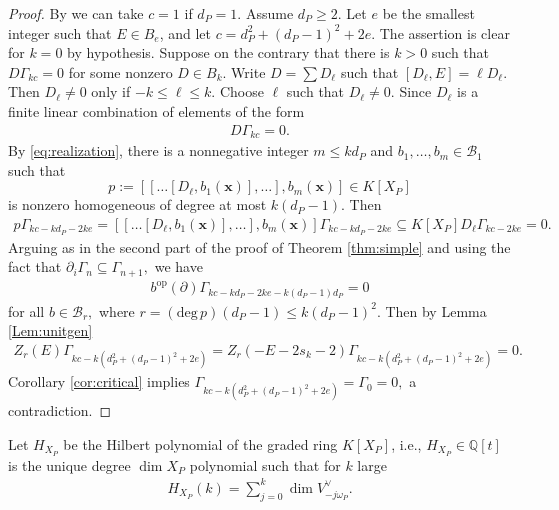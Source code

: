 \documentclass[11pt,a4paper,usenames,dvipsnames,reqno]{amsart}
\numberwithin{equation}{section}
\newcommand{\qq}{\mathbb Q}
\theoremstyle{definition}
\theoremstyle{remark}
\begin{document}
\begin{proof}
By \cite[Lemma 9.4.1]{C:Dmod} we can take $c=1$ if $d_P=1$. Assume $d_P\ge 2$. Let $e$ be the smallest integer such that $E\in B_{e}$, and let $c=d_P^2+(d_P-1)^2+2e.$ The assertion is clear for $k=0$ by hypothesis. Suppose on the contrary that there is $k>0$ such that $D\Gamma_{kc}=0$ for some nonzero $D\in B_k$. Write $D=\sum D_\ell$ such that $[D_\ell,E]=\ell D_\ell.$ Then $D_\ell\neq 0$ only if $-k\le \ell\le k$. Choose $\ell$ such that $D_\ell\neq 0$. Since $D_\ell$ is a finite linear combination of elements of the form
\begin{align*}
   [[\ldots[D,\underbrace{E],\ldots], E]}_{r \textrm{ times}}
\end{align*}
for $0\le r\le 2k,$ we have 
\begin{align*}
    D_\ell\Gamma_{kc-2ke}\subseteq K[E]D\Gamma_{kc}=0.
\end{align*}
By \eqref{eq:realization}, there is a nonnegative integer $m\le kd_P$ and  $b_1,\ldots,b_m\in \mathcal{B}_1$ such that 
\[p:=[[\ldots[D_\ell,b_1(\mathbf{x})],\ldots], b_{m}(\mathbf{x})]\in K[X_P]\]
is nonzero homogeneous of degree at most $k(d_P-1).$ Then
\begin{align*}
    p\Gamma_{kc-kd_P-2ke}=[[\ldots[D_\ell,b_1(\mathbf{x})],\ldots], b_{m}(\mathbf{x})]\Gamma_{kc-kd_P-2ke}\subseteq K[X_P]D_\ell\Gamma_{kc-2ke} =0.
\end{align*}
Arguing as in the second part of the proof of Theorem \ref{thm:simple} and using the fact that $\partial_i \Gamma_n\subseteq\Gamma_{n+1},$ we have 
\begin{align*}
    b^{\mathrm{op}}(\partial)\Gamma_{kc-kd_P-2ke-k(d_P-1)d_P}=0
\end{align*}
for all $b\in \mathcal{B}_r,$ where $r=(\mathrm{deg}\, p)(d_P-1)\le k(d_P-1)^2$. Then by Lemma \ref{Lem:unitgen} 
\begin{align*}
    Z_r(E)\Gamma_{kc-k(d_P^2+(d_P-1)^2+2e)}= Z_r(-E-2s_k-2)\Gamma_{kc-k(d_P^2+(d_P-1)^2+2e)}=0.
\end{align*}
Corollary \ref{cor:critical} implies $\Gamma_{kc-k(d_P^2+(d_P-1)^2+2e)}=\Gamma_0=0,$ a contradiction.
\end{proof}

Let $H_{X_P}$ be the Hilbert polynomial of the graded ring $K[X_P]$, i.e., $H_{X_P}\in\qq[t]$ is the unique degree $\dim X_P$ polynomial such that for $k$ large
\begin{align*}
    H_{X_P}(k)=\sum_{j=0}^k\dim V_{-j\omega_P}^\lor.
\end{align*}
\end{document}
